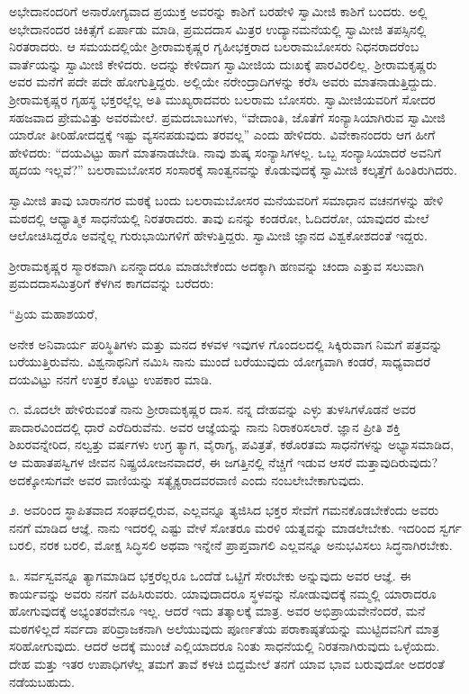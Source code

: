  ಅಭೇದಾನಂದರಿಗೆ ಅನಾರೋಗ್ಯವಾದ ಪ್ರಯುಕ್ತ ಅವರನ್ನು ಕಾಶಿಗೆ ಬರಹೇಳಿ ಸ್ವಾಮೀಜಿ ಕಾಶಿಗೆ ಬಂದರು. ಅಲ್ಲಿ ಅಭೇದಾನಂದರ ಚಿಕಿತ್ಸೆಗೆ ಏರ್ಪಾಡು ಮಾಡಿ, ಪ್ರಮದದಾಸ ಮಿತ್ರರ ಉದ್ಯಾನಮನೆಯಲ್ಲಿ ಸ್ವಾಮೀಜಿ ತಪಸ್ಸಿನಲ್ಲಿ ನಿರತರಾದರು. ಆ ಸಮಯದಲ್ಲಿಯೇ ಶ‍್ರೀರಾಮಕೃಷ್ಣರ ಗೃಹೀಭಕ್ತರಾದ ಬಲರಾಮಬೋಸರು ನಿಧನರಾದರೆಂಬ ವಾರ್ತೆಯನ್ನು ಸ್ವಾಮೀಜಿ ಕೇಳಿದರು. ಅದನ್ನು ಕೇಳಿದಾಗ ಸ್ವಾಮೀಜಿಯ ದುಃಖಕ್ಕೆ ಪಾರವಿರಲಿಲ್ಲ. ಶ‍್ರೀರಾಮಕೃಷ್ಣರು ಅವರ ಮನೆಗೆ ಪದೇ ಪದೇ ಹೋಗುತ್ತಿದ್ದರು. ಅಲ್ಲಿಯೇ ನರೇಂದ್ರಾದಿಗಳನ್ನು ಕರೆಸಿ ಅವರು ಮಾತನಾಡುತ್ತಿದ್ದುದು. ಶ‍್ರೀರಾಮಕೃಷ್ಣರ ಗೃಹಸ್ಥ ಭಕ್ತರಲ್ಲೆಲ್ಲ ಅತಿ ಮುಖ್ಯರಾದವರು ಬಲರಾಮ ಬೋಸರು. ಸ್ವಾಮೀಜಿಯವರಿಗೆ ಸೋದರ ಸಹಜವಾದ ಪ್ರೇಮವಿತ್ತು ಅವರಮೇಲೆ. ಪ್ರಮದಬಾಬುಗಳು, “ವೇದಾಂತಿ, ಜೊತೆಗೆ ಸಂನ್ಯಾಸಿಯಾಗಿರುವ ಸ್ವಾಮೀಜಿ ಯಾರೋ ತೀರಿಹೋದದ್ದಕ್ಕೆ ಇಷ್ಟು ವ್ಯಸನಪಡುವುದು ತರವಲ್ಲ” ಎಂದು ಹೇಳಿದರು. ವಿವೇಕಾನಂದರು ಆಗ ಹೀಗೆ ಹೇಳಿದರು: “ದಯವಿಟ್ಟು ಹಾಗೆ ಮಾತನಾಡಬೇಡಿ. ನಾವು ಶುಷ್ಕ ಸಂನ್ಯಾಸಿಗಳಲ್ಲ. ಒಬ್ಬ ಸಂನ್ಯಾಸಿಯಾದರೆ ಅವನಿಗೆ ಹೃದಯ ಇಲ್ಲವೆ?” ಬಲರಾಮಬೋಸರ ಸಂಸಾರಕ್ಕೆ ಸಾಂತ್ವನವನ್ನು ಕೊಡುವುದಕ್ಕೆ ಸ್ವಾಮೀಜಿ ಕಲ್ಕತ್ತೆಗೆ ಹಿಂತಿರುಗಿದರು. 

 ಸ್ವಾಮೀಜಿ ತಾವು ಬಾರಾನಗರ ಮಠಕ್ಕೆ ಬಂದು ಬಲರಾಮಬೋಸರ ಮನೆಯವರಿಗೆ ಸಮಾಧಾನ ವಚನಗಳನ್ನು ಹೇಳಿ ಮಠದಲ್ಲಿ ಆಧ್ಯಾತ್ಮಿಕ ಸಾಧನೆಯಲ್ಲಿ ನಿರತರಾದರು. ತಾವು ಏನನ್ನು ಕಂಡರೋ, ಓದಿದರೋ, ಯಾವುದರ ಮೇಲೆ ಆಲೋಚಿಸಿದ್ದರೊ ಅವನ್ನೆಲ್ಲ ಗುರುಭಾಯಿಗಳಿಗೆ ಹೇಳುತ್ತಿದ್ದರು. ಸ್ವಾಮೀಜಿ ಜ್ಞಾನದ ವಿಶ್ವಕೋಶದಂತೆ ಇದ್ದರು. 

 ಶ‍್ರೀರಾಮಕೃಷ್ಣರ ಸ್ಮಾರಕವಾಗಿ ಏನನ್ನಾದರೂ ಮಾಡಬೇಕೆಂದು ಅದಕ್ಕಾಗಿ ಹಣವನ್ನು ಚಂದಾ ಎತ್ತುವ ಸಲುವಾಗಿ ಪ್ರಮದದಾಸಮಿತ್ರರಿಗೆ ಕೆಳಗಿನ ಕಾಗದವನ್ನು ಬರೆದರು: 

 “ಪ್ರಿಯ ಮಹಾಶಯರೆ, 

 ಅನೇಕ ಅನಿವಾರ್ಯ ಪರಿಸ್ಥಿತಿಗಳು ಮತ್ತು ಮನದ ಕಳವಳ ಇವುಗಳ ಗೊಂದಲದಲ್ಲಿ ಸಿಕ್ಕಿರುವಾಗ ನಿಮಗೆ ಪತ್ರವನ್ನು ಬರೆಯುತ್ತಿರುವೆನು. ವಿಶ್ವನಾಥನಿಗೆ ನಮಿಸಿ ನಾನು ಮುಂದೆ ಬರೆಯುವುದು ಯೋಗ್ಯವಾಗಿ ಕಂಡರೆ, ಸಾಧ್ಯವಾದರೆ ದಯವಿಟ್ಟು ನನಗೆ ಉತ್ತರ ಕೊಟ್ಟು ಉಪಕಾರ ಮಾಡಿ. 

 ೧. ಮೊದಲೇ ಹೇಳಿರುವಂತೆ ನಾನು ಶ‍್ರೀರಾಮಕೃಷ್ಣರ ದಾಸ. ನನ್ನ ದೇಹವನ್ನು ಎಳ್ಳು ತುಳಸಿಗಳೊಡನೆ ಅವರ ಪಾದಾರವಿಂದದಲ್ಲಿ ಧಾರೆ ಎರೆದಿರುವೆನು. ಅವರ ಆಜ್ಞೆಯನ್ನು ನಾನು ನಿರಾಕರಿಸಲಾರೆ. ಜ್ಞಾನ ಪ್ರೀತಿ ಶಕ್ತಿ ಶಿಖರವನ್ನೇರಿದ, ನಲ್ವತ್ತು ವರ್ಷಗಳು ಉಗ್ರ ತ್ಯಾಗ, ವೈರಾಗ್ಯ, ಪವಿತ್ರತೆ, ಕಠೊರತಮ ಸಾಧನೆಗಳನ್ನು ಅಭ್ಯಾಸಮಾಡಿದ, ಆ ಮಹಾತಪಸ್ವಿಗಳ ಜೀವನ ನಿಷ್ಪ್ರಯೋಜನವಾದರೆ, ಈ ಜಗತ್ತಿನಲ್ಲಿ ನೆಚ್ಚಿಗೆ ಇಡುವ ಆಸರೆ ಮತ್ತಾವುದಿರುವುದು? ಅದಕ್ಕೋಸುಗವೇ ಅವರ ವಾಣಿಯನ್ನು ಸತ್ಯೈಕ್ಯರಾದವರವಾಣಿ ಎಂದು ನಂಬಲೇಬೇಕಾಗುವುದು. 

 ೨. ಅವರಿಂದ ಸ್ಥಾಪಿತವಾದ ಸಂಘದಲ್ಲಿರುವ, ಎಲ್ಲವನ್ನೂ ತ್ಯಜಿಸಿದ ಭಕ್ತರ ಸೇವೆಗೆ ಗಮನಕೊಡಬೇಕೆಂದು ಅವರು ನನಗೆ ಮಾಡಿದ ಆಜ್ಞೆ. ನಾನು ಇದರಲ್ಲಿ ಎಷ್ಟು ವೇಳೆ ಸೋತರೂ ಮರಳಿ ಯತ್ನವನ್ನು ಮಾಡಲೇಬೇಕು. ಇದರಿಂದ ಸ್ವರ್ಗ ಬರಲಿ, ನರಕ ಬರಲಿ, ಮೋಕ್ಷ ಸಿದ್ಧಿಸಲಿ ಅಥವಾ ಇನ್ನೇನೆ ಪ್ರಾಪ್ತವಾಗಲಿ ಎಲ್ಲವನ್ನೂ ಅನುಭವಿಸಲು ಸಿದ್ಧನಾಗಿರಬೇಕು. 

 ೩. ಸರ್ವಸ್ವವನ್ನೂ ತ್ಯಾಗಮಾಡಿದ ಭಕ್ತರೆಲ್ಲರೂ ಒಂದೆಡೆ ಒಟ್ಟಿಗೆ ಸೇರಬೇಕು ಅನ್ನುವುದು ಅವರ ಆಜ್ಞೆ. ಈ ಕಾರ್ಯವನ್ನು ಅವರು ನನಗೆ ವಹಿಸಿರುವರು. ಯಾವುದಾದರೂ ಸ್ಥಳವನ್ನು ನೋಡುವುದಕ್ಕೆ ನಮ್ಮಲ್ಲಿ ಯಾರಾದರೂ ಹೋಗುವುದಕ್ಕೆ ಅಭ್ಯಂತರವೇನೂ ಇಲ್ಲ. ಆದರೆ ಇದು ತತ್ಕಾಲಕ್ಕೆ ಮಾತ್ರ. ಅವರ ಅಭಿಪ್ರಾಯವೇನೆಂದರೆ, ಮನೆ ಮಠಗಳಿಲ್ಲದೆ ಸರ್ವದಾ ಪರಿವ್ರಾಜಕನಾಗಿ ಅಲೆಯುವುದು ಪೂರ್ಣತೆಯ ಪರಾಕಾಷ್ಠತೆಯನ್ನು ಮುಟ್ಟಿದವನಿಗೆ ಮಾತ್ರ ಸರಿಹೋಗುವುದು. ಆದರೆ ಅದಕ್ಕೆ ಮುಂಚೆ ಎಲ್ಲಿಯಾದರೂ ನಿಂತು ಸಾಧನೆಯಲ್ಲಿ ನಿರತನಾಗಿರುವುದು ಒಳ್ಳೆಯದು. ದೇಹ ಮತ್ತು ಇತರ ಉಪಾಧಿಗಳೆಲ್ಲ ತಮಗೆ ತಾವೆ ಕಳಚಿ ಬಿದ್ದಮೇಲೆ ತನಗೆ ಯಾವ ಭಾವ ಬರುವುದೋ ಅದರಂತೆ ನಡೆಯಬಹುದು. 

